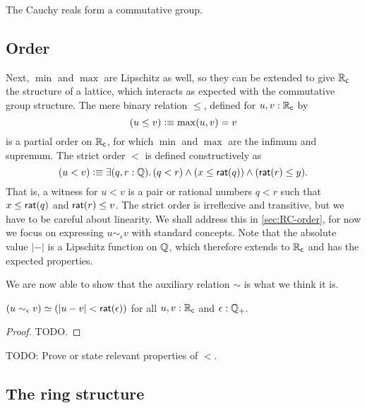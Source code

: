 \begin{thm} \label{RC-commutative-group}
  The Cauchy reals form a commutative group.
\end{thm}

\subsection{Order}
\label{sec:order}

Next, $\min$ and $\max$ are Lipschitz as well, so they can be extended to give $\mathbb{R}_\mathsf{c}$ the
structure of a lattice, which interacts as expected with the commutative group structure.
The mere binary relation $\leq$, defined for $u, v : \mathbb{R}_\mathsf{c}$ by
%
\begin{equation*}
  (u \leq v) \vcentcolon\equiv \max(u,v) = v
\end{equation*}
%
is a partial order on $\mathbb{R}_\mathsf{c}$, for which $\min$ and $\max$ are the infimum and supremum. The
strict order $<$ is defined constructively as
%
\begin{equation*}
  (u < v) \defeq
  \exis{q, r : \Q} (q < r) \land (x \leq \rcrat(q)) \land (\rcrat(r) \leq y).
\end{equation*}
%
That is, a witness for $u < v$ is a pair or rational numbers $q < r$ such that $x \leq
\mathsf{rat}(q)$ and $\mathsf{rat}(r) \leq v$. The strict order is irreflexive and transitive, but we
have to be careful about linearity. We shall address this in \autoref{sec:RC-order}, for
now we focus on expressing $u \sim_\epsilon v$ with standard concepts. Note that the
absolute value $|{-}|$ is a Lipschitz function on $\mathbb{Q}$, which therefore extends to $\mathbb{R}_\mathsf{c}$
and has the expected properties.

We are now able to show that the auxiliary relation $\sim$ is what we think it is.

\begin{thm} \label{RC-sim-eqv-le}
  $(u \sim_\epsilon v) \simeq (|u - v| < \mathsf{rat}(\epsilon))$
  for all $u, v : \mathbb{R}_\mathsf{c}$ and $\epsilon : \mathbb{Q}_{+}$.
\end{thm}

\begin{proof}
  TODO.
\end{proof}

TODO: Prove or state relevant properties of $<$.

\subsection{The ring structure}
\label{sec:ring-structure}

